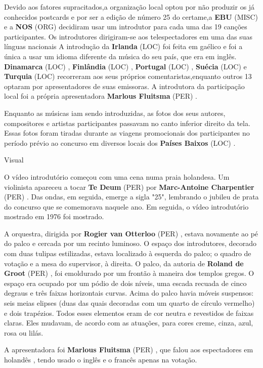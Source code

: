 \documentclass[12pt,a4paper]{article}
\begin{document}
Devido aos fatores supracitados,a organização local optou por não produzir os já conhecidos postcards e por ser a edição de número 25 do certame,a \textbf{EBU} (MISC) e a \textbf{NOS} (ORG) decidiram usar um introdutor para cada uma das 19 canções participantes. Os introdutores dirigiram-se aos telespectadores em uma das suas línguas nacionais A introdução da \textbf{Irlanda} (LOC) foi feita em gaélico e foi a única a usar um idioma diferente da música do seu país, que era em inglês. \textbf{Dinamarca} (LOC) , \textbf{Finlândia} (LOC) , \textbf{Portugal} (LOC) , \textbf{Suécia} (LOC) e \textbf{Turquia} (LOC) recorreram aos seus próprios comentaristas,enquanto outros 13 optaram por apresentadores de suas emissoras. A introdutora da participação local foi a própria apresentadora \textbf{Marlous Fluitsma} (PER) .

Enquanto as músicas iam sendo introduzidas, as fotos dos seus autores, compositores e artistas participantes passavam no canto inferior direito da tela. Essas fotos foram tiradas durante as viagens promocionais dos participantes no período prévio ao concurso em diversos locais dos \textbf{Países Baixos} (LOC) .



Visual

O vídeo introdutório começou com uma cena numa praia holandesa. Um violinista apareceu a tocar \textbf{Te Deum} (PER) por \textbf{Marc-Antoine Charpentier} (PER) . Das ondas, em seguida, emerge a sigla "25", lembrando o jubileu de prata do concurso que se comemorava naquele ano. Em seguida, o vídeo introdutório mostrado em 1976 foi mostrado.

A orquestra, dirigida por \textbf{Rogier van Otterloo} (PER) , estava novamente ao pé do palco e cercada por um recinto luminoso. O espaço dos introdutores, decorado com duas tulipas estilizadas, estava localizado à esquerda do palco; o quadro de votação e a mesa do supervisor, à direita. O palco, da autoria de \textbf{Roland de Groot} (PER) , foi emoldurado por um frontão à maneira dos templos gregos. O espaço era ocupado por um pódio de dois níveis, uma escada recuada de cinco degraus e três faixas horizontais curvas. Acima do palco havia móveis suspensos: seis meias elipses (duas das quais decoradas com um quarto de círculo vermelho) e dois trapézios. Todos esses elementos eram de cor neutra e revestidos de faixas claras. Eles mudavam, de acordo com as atuações, para cores creme, cinza, azul, rosa ou lilás.

A apresentadora foi \textbf{Marlous Fluitsma} (PER) , que falou aos espectadores em holandês , tendo usado o inglês e o francês apenas na votação.
\end{document}
